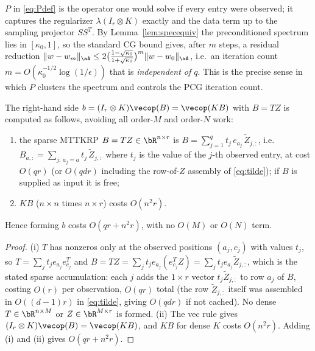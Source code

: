\begin{remark}\label{rem:whyprecond}
$P$ in \eqref{eq:Pdef} is the operator one would solve if every entry were
observed; it captures the regularizer $\lambda(I_r\otimes K)$ exactly and the
data term up to the sampling projector $SS^{T}$. By Lemma~\ref{lem:specequiv}
the preconditioned spectrum lies in $[\kappa_0,1]$, so the standard CG bound
gives, after $m$ steps, a residual reduction
$\|w-w_m\|_{\aA}\le2\big(\tfrac{1-\sqrt{\kappa_0}}{1+\sqrt{\kappa_0}}\big)^{m}\|w-w_0\|_{\aA}$,
i.e.\ an iteration count $m=O(\kappa_0^{-1/2}\log(1/\epsilon))$ that is
\emph{independent of $q$}. This is the precise sense in which $P$ clusters the
spectrum and controls the PCG iteration count.
\end{remark}

\begin{lemma}\label{lem:rhs}
The right-hand side $b=(I_r\otimes K)\vecop(B)=\vecop(KB)$ with $B=TZ$ is
computed as follows, avoiding all order-$M$ and order-$N$ work:
\begin{enumerate}[label=\textup{(\roman*)}]
\item the sparse MTTKRP $B=TZ\in\bR^{n\times r}$ is
      $B=\sum_{j=1}^{q}t_j\,e_{a_j}\,\tilde Z_{j,:}$, i.e.\
      $B_{a,:}=\sum_{j:\,a_j=a} t_j\,\tilde Z_{j,:}$ where $t_j$ is the value of
      the $j$-th observed entry, at cost $O(qr)$ (or $O(qdr)$ including the
      row-of-$Z$ assembly of \eqref{eq:tilde}); if $B$ is supplied as input it
      is free;
\item $KB$ ($n\times n$ times $n\times r$) costs $O(n^{2}r)$.
\end{enumerate}
Hence forming $b$ costs $O(qr+n^{2}r)$, with no $O(M)$ or $O(N)$ term.
\end{lemma}

\begin{proof}
(i) $T$ has nonzeros only at the observed positions $(a_j,c_j)$ with values
$t_j$, so $T=\sum_j t_j e_{a_j}e_{c_j}^{T}$ and
$B=TZ=\sum_j t_j e_{a_j}(e_{c_j}^{T}Z)=\sum_j t_j e_{a_j}\tilde Z_{j,:}$,
which is the stated sparse accumulation: each $j$ adds the $1\times r$ vector
$t_j\tilde Z_{j,:}$ to row $a_j$ of $B$, costing $O(r)$ per observation, $O(qr)$
total (the row $\tilde Z_{j,:}$ itself was assembled in $O((d-1)r)$ in
\eqref{eq:tilde}, giving $O(qdr)$ if not cached). No dense $T\in\bR^{n\times M}$
or $Z\in\bR^{M\times r}$ is formed. (ii) The vec rule gives
$(I_r\otimes K)\vecop(B)=\vecop(KB)$, and $KB$ for dense $K$ costs $O(n^{2}r)$.
Adding (i) and (ii) gives $O(qr+n^{2}r)$.
\end{proof}

